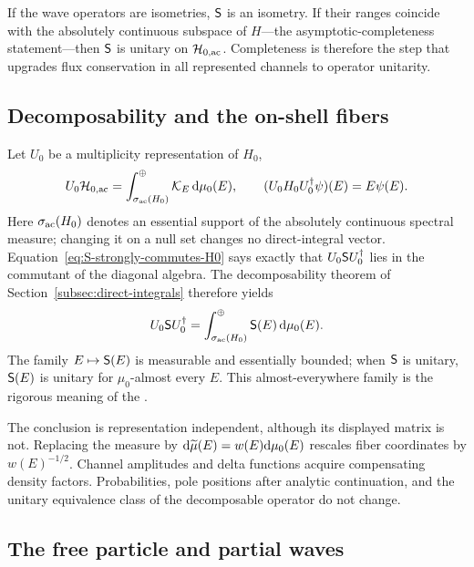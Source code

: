 If the wave operators are isometries, $\mathsf{S}$ is an isometry.  If their
ranges coincide with the absolutely continuous subspace of $H$---the
asymptotic-completeness statement---then $\mathsf{S}$ is unitary on
$\mathcal{H}_{0,\mathrm{ac}}$.  Completeness is therefore the step that upgrades
flux conservation in all represented channels to operator unitarity.

\subsection{Decomposability and the on-shell fibers}

Let $U_0$ be a multiplicity representation of $H_0$,
\begin{equation}
  U_0\mathcal{H}_{0,\mathrm{ac}}
  =\int_{\sigma_{\mathrm{ac}}(H_0)}^\oplus
    \mathcal K_E\,\mathrm{d}\mu_0(E),
  \qquad
  (U_0H_0U_0^\dagger\psi)(E)=E\psi(E).
  \label{eq:H0-multiplicity-stage-II}
\end{equation}
Here $\sigma_{\mathrm{ac}}(H_0)$ denotes an essential support of the
absolutely continuous spectral measure; changing it on a null set changes no
direct-integral vector.
Equation~\eqref{eq:S-strongly-commutes-H0} says exactly that
$U_0\mathsf{S} U_0^\dagger$ lies in the commutant of the diagonal algebra.
The decomposability theorem of Section~\ref{subsec:direct-integrals} therefore
yields
\begin{equation}
  U_0\mathsf{S} U_0^\dagger
  =\int_{\sigma_{\mathrm{ac}}(H_0)}^\oplus
    \mathsf{S}(E)\,\mathrm{d}\mu_0(E).
  \label{eq:S-direct-integral}
\end{equation}
The family $E\mapsto\mathsf{S}(E)$ is measurable and essentially bounded;
when $\mathsf{S}$ is unitary, $\mathsf{S}(E)$ is unitary for
$\mu_0$-almost every $E$.  This almost-everywhere family is the rigorous
meaning of the .

The conclusion is representation independent, although its displayed matrix
is not.  Replacing the measure by
$\mathrm{d}\widetilde\mu(E)=w(E)\mathrm{d}\mu_0(E)$ rescales fiber coordinates by
$w(E)^{-1/2}$.  Channel amplitudes and delta functions acquire compensating
density factors.  Probabilities, pole positions after analytic continuation,
and the unitary equivalence class of the decomposable operator do not change.

\subsection{The free particle and partial waves}

